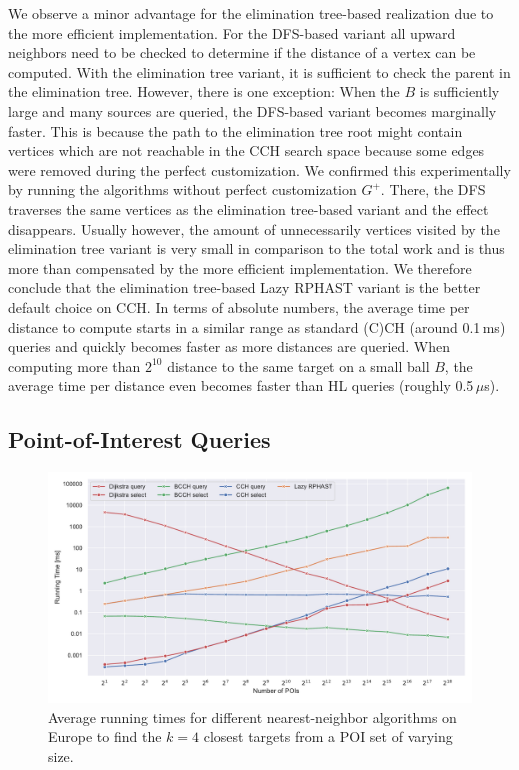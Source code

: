 \documentclass[a4paper, english, cleveref]{lipics-v2021}
\begin{document}
We observe a minor advantage for the elimination tree-based realization due to the more efficient implementation.
For the DFS-based variant all upward neighbors need to be checked to determine if the distance of a vertex can be computed.
With the elimination tree variant, it is sufficient to check the parent in the elimination tree.
However, there is one exception:
When the $B$ is sufficiently large and many sources are queried, the DFS-based variant becomes marginally faster.
This is because the path to the elimination tree root might contain vertices which are not reachable in the CCH search space because some edges were removed during the perfect customization.
We confirmed this experimentally by running the algorithms without perfect customization $G^+$.
There, the DFS traverses the same vertices as the elimination tree-based variant and the effect disappears.
Usually however, the amount of unnecessarily vertices visited by the elimination tree variant is very small in comparison to the total work and is thus more than compensated by the more efficient implementation.
We therefore conclude that the elimination tree-based Lazy RPHAST variant is the better default choice on CCH.
In terms of absolute numbers, the average time per distance to compute starts in a similar range as standard (C)CH (around 0.1\,ms) queries and quickly becomes faster as more distances are queried.
When computing more than $2^{10}$ distance to the same target on a small ball $B$, the average time per distance even becomes faster than HL queries (roughly 0.5\,$\mu$s).

\subsection{Point-of-Interest Queries}

\begin{figure}
\centering
\includegraphics[width=\linewidth]{fig/knn.pdf}
\caption{
Average running times for different nearest-neighbor algorithms on Europe to find the $k=4$ closest targets from a POI set of varying size.
}\label{fig:knn}
\end{figure}
\end{document}
